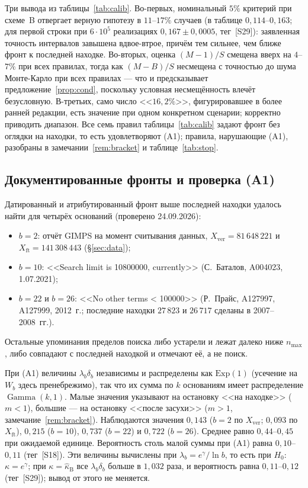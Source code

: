 \documentclass[11pt,a4paper]{article}
\theoremstyle{plain}
\theoremstyle{remark}
\newcommand{\eg}{e^{\gamma}}
\DeclareMathOperator{\Gam}{Gamma}
\begin{document}
Три вывода из таблицы~\ref{tab:calib}. Во-первых, номинальный $5\%$ критерий при
схеме~B отвергает верную гипотезу в $11$--$17\%$ случаев (в таблице
$0{,}114$--$0{,}163$; для первой строки при $6\cdot10^5$ реализациях
$0{,}167\pm0{,}0005$, тег~[S29]): заявленная точность
интервалов завышена вдвое-втрое, причём тем сильнее, чем ближе фронт к последней
находке. Во-вторых, оценка $(M-1)/S$ смещена вверх на $4$--$7\%$ при всех правилах,
тогда как $(M-B)/S$ несмещена с точностью до шума Монте-Карло при всех правилах ---
что и предсказывает предложение~\ref{prop:cond}, поскольку условная несмещённость
влечёт безусловную. В-третьих, само число <<$16{,}2\%$>>, фигурировавшее в более
ранней редакции, есть значение при одном конкретном сценарии; корректно приводить
диапазон. Все семь правил таблицы~\ref{tab:calib} задают фронт без оглядки на
находки, то есть удовлетворяют (A1); правила, нарушающие (A1), разобраны в
замечании~\ref{rem:bracket} и таблице~\ref{tab:stop}.

\subsection{Документированные фронты и проверка (A1)}\label{sec:frontiers}

Датированный и атрибутированный фронт выше последней находки удалось найти для
четырёх оснований (проверено 24.09.2026):
\begin{itemize}
\item $b=2$: отчёт GIMPS на момент считывания данных, $X_{\mathrm{ver}}=81\,648\,221$
и $X_{\mathrm{ft}}=141\,308\,443$ (\S\ref{sec:data});
\item $b=10$: <<Search limit is 10800000, currently>> (С.~Баталов, A004023,
1.07.2021);
\item $b=22$ и $b=26$: <<No other terms < 100000>> (Р.~Прайс, A127997, A127999,
2012~г.; последние находки $27\,823$ и $26\,717$ сделаны в 2007--2008~гг.).
\end{itemize}
Остальные упоминания пределов поиска либо устарели и лежат далеко ниже $n_{\max}$,
либо совпадают с последней находкой и отмечают её, а не поиск.

При (A1) величины $\lambda_b\delta_b$ независимы и распределены как $\mathrm{Exp}(1)$
(усечение на $W_b$ здесь пренебрежимо), так что их сумма по $k$ основаниям имеет
распределение $\Gam(k,1)$. Малые значения указывают на остановку <<на находке>>
($m<1$), большие --- на остановку <<после засухи>> ($m>1$,
замечание~\ref{rem:bracket}). Наблюдаются значения $0{,}143$ ($b=2$ по
$X_{\mathrm{ver}}$; $0{,}093$ по $X_{\mathrm{ft}}$), $0{,}215$ ($b=10$), $0{,}737$
($b=22$) и $0{,}722$ ($b=26$). Среднее равно $0{,}44$--$0{,}45$ при ожидаемой единице.
Вероятность столь малой суммы при (A1) равна $0{,}10$--$0{,}11$ (тег~[S18]). Эти
величины вычислены при $\lambda_b=\eg/\ln b$, то есть при $H_0$: $\kappa=\eg$; при
$\kappa=\hat\kappa_{\mathrm B}$ все $\lambda_b\delta_b$ больше в $1{,}032$ раза, и
вероятность равна $0{,}11$--$0{,}12$ (тег~[S29]); вывод от этого не меняется.
\end{document}

